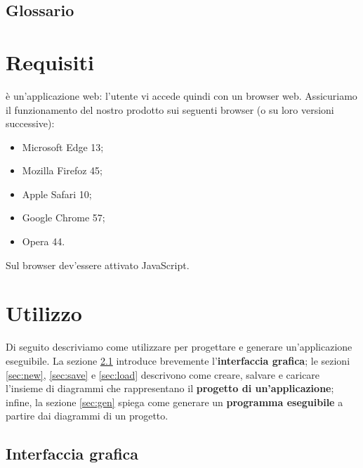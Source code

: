 \subsection{Glossario}
\presgloss






\section{Requisiti} \label{sec:requisiti}

\proj{} è un'applicazione web: l'utente vi accede quindi con un browser web. Assicuriamo il funzionamento del nostro prodotto sui seguenti browser (o su loro versioni successive):
\begin{itemize} %
	\item Microsoft Edge 13;
	\item Mozilla Firefoz 45;
	\item Apple Safari 10;
	\item Google Chrome 57;
	\item Opera 44.
\end{itemize}
Sul browser dev'essere attivato JavaScript.






\section{Utilizzo} \label{sec:utilizzo} %

Di seguito descriviamo come utilizzare \proj{} per progettare e generare un'applicazione eseguibile. La sezione \ref{sec:gui} introduce brevemente l'\textbf{interfaccia grafica}; le sezioni \ref{sec:new}, \ref{sec:save} e \ref{sec:load} descrivono come creare, salvare e caricare l'insieme di diagrammi che rappresentano il \textbf{progetto di un'applicazione}; infine, la sezione \ref{sec:gen} spiega come generare un \textbf{programma eseguibile} a partire dai diagrammi di un progetto.



\subsection{Interfaccia grafica} \label{sec:gui}

